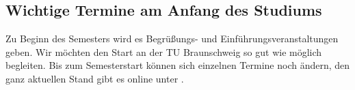 
\subsection{Wichtige Termine am Anfang des Studiums}


Zu Beginn des Semesters wird es Begrüßungs- und Einführungsveranstaltungen geben. Wir möchten den Start an der TU Braunschweig so gut wie möglich begleiten. Bis zum Semesterstart können sich einzelnen Termine noch ändern, den ganz aktuellen Stand gibt es online unter .

\renewcommand{\labelitemi}{$\bullet$}
\renewcommand{\labelitemii}{$\bullet$}
\renewcommand{\labelitemiii}{$\bullet$}
\renewcommand{\labelitemiv}{$\bullet$}

